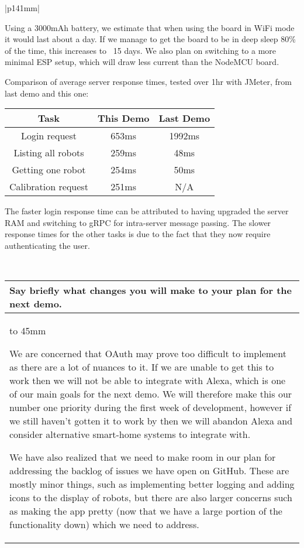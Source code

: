 \documentclass[a4paper]{article}
\newcommand{\colWidth}{141mm}
\begin{document}
\begin{center}
\begin{tabular}{|p{\colWidth}|}
{		Using a 3000mAh battery, we estimate that when using the board in WiFi mode it would last about a day.
		If we manage to get the board to be in deep sleep 80\% of the time, this increases to ~15 days.
		We also plan on switching to a more minimal ESP setup, which will draw less current than the NodeMCU board.

		\vspace{2mm}
		
		Comparison of average server response times, tested over 1hr with JMeter, from last demo and this one:

		\begin{tabular}{ | c | c | c |}
			\hline
			Task & This Demo & Last Demo \\
			\hline
			Login request & 653ms & 1992ms \\
			Listing all robots & 259ms & 48ms \\
			Getting one robot & 254ms & 50ms \\
			Calibration request & 251ms & N/A \\
			\hline
		\end{tabular}

		The faster login response time can be attributed to having upgraded the server RAM and switching to gRPC for intra-server message passing.
		The slower response times for the other tasks is due to the fact that they now require authenticating the user.

  }
  \\
  \hline
\end{tabular}
\vskip 5mm


\begin{tabular}{|p{\colWidth}|}
	\hline
	\cellcolor{blue!25}\large
	\textbf{Say briefly what changes you will make to your plan for the next demo.}
	\\ \hline
	\vtop to 45mm{
		We are concerned that OAuth may prove too difficult to implement as there are a lot of nuances to it.
		If we are unable to get this to work then we will not be able to integrate with Alexa, which is one of
		our main goals for the next demo. We will therefore make this our number one priority during the first
		week of development, however if we still haven't gotten it to work by then we will abandon Alexa and
		consider alternative smart-home systems to integrate with.

		\vspace{2mm}

		We have also realized that we need to make room in our plan for addressing the backlog of issues we have
		open on GitHub. These are mostly minor things, such as implementing better logging and adding icons to the display of robots,
		but there are also larger concerns such as making the app pretty (now that we have a large portion of the functionality down)
		which we need to address.
  	}
  \\
  \hline
\end{tabular}

\end{center}
  
\end{document}

